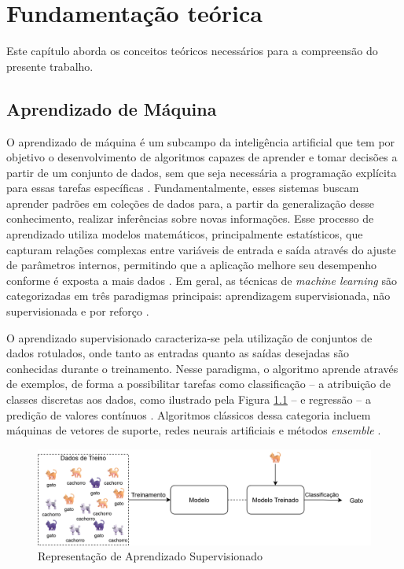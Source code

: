 \chapter{Fundamentação teórica}

Este capítulo aborda os conceitos teóricos necessários para a compreensão do presente trabalho.

\section{Aprendizado de Máquina}

O aprendizado de máquina é um subcampo da inteligência artificial que tem por objetivo o desenvolvimento de algoritmos capazes de aprender e tomar decisões a partir de um conjunto de dados, sem que seja necessária a programação explícita para essas tarefas específicas \cite{mlDietterich}. Fundamentalmente, esses sistemas buscam aprender padrões em coleções de dados para, a partir da generalização desse conhecimento, realizar inferências sobre novas informações. Esse processo de aprendizado utiliza modelos matemáticos, principalmente estatísticos, que capturam relações complexas entre variáveis de entrada e saída através do ajuste de parâmetros internos, permitindo que a aplicação melhore seu desempenho conforme é exposta a mais dados \cite{mlSarker,mlDietterich}. Em geral, as técnicas de \textit{machine learning} são categorizadas em três paradigmas principais: aprendizagem supervisionada, não supervisionada e por reforço \cite{mlSarker}.

O aprendizado supervisionado caracteriza-se pela utilização de conjuntos de dados rotulados, onde tanto as entradas quanto as saídas desejadas são conhecidas durante o treinamento. Nesse paradigma, o algoritmo aprende através de exemplos, de forma a possibilitar tarefas como classificação -- a atribuição de classes discretas aos dados, como ilustrado pela Figura \ref{fig:mlsupervised} -- e regressão -- a predição de valores contínuos \cite{mlDietterich}. Algoritmos clássicos dessa categoria incluem máquinas de vetores de suporte, redes neurais artificiais e métodos \textit{ensemble} \cite{mlSarker}.

\begin{figure}[H]
	\caption{\label{fig:mlsupervised}Representação de Aprendizado Supervisionado}
    \begin{center}
    \includegraphics[width=1\linewidth]{images/mlsupervised.png}
	\end{center}
\end{figure}

